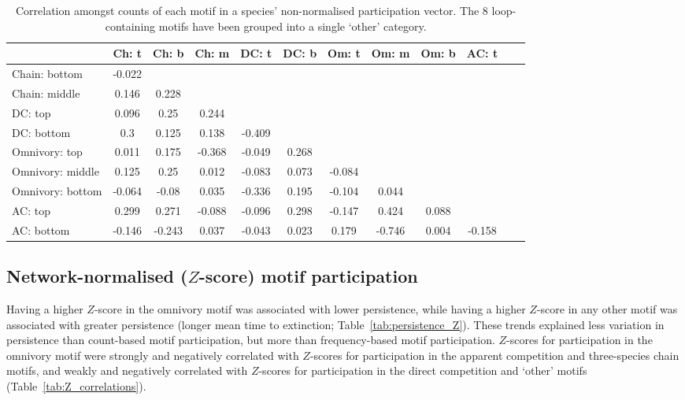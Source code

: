 \documentclass[12pt]{article}
\begin{document}
		\begin{table}[hb!]
    		\caption{Correlation amongst counts of each motif in a species' non-normalised participation vector. The 8 loop-containing motifs have been grouped into a single `other' category.}
    		\label{tab:position_freq_correlations}
    		\footnotesize
    		\begin{tabular}{l | c c c c c c c c c c c}    
        		&	Ch: t	&	Ch: b	&	Ch: m	&	DC: t	&	DC: b	&	Om: t	&	Om: m	&	Om: b	&	AC: t	\\
        		\hline
                Chain: bottom	&	-0.022	&		&		&		&		&		&		&		&		\\
                Chain: middle	&	0.146	&	0.228	&		&		&		&		&		&		&		\\
                DC: top	&	0.096	&	0.25	&	0.244	&		&		&		&		&		&		\\
                DC: bottom	&	0.3	&	0.125	&	0.138	&	-0.409	&		&		&		&		&		\\
                Omnivory: top	&	0.011	&	0.175	&	-0.368	&	-0.049	&	0.268	&		&		&		&		\\
                Omnivory: middle	&	0.125	&	0.25	&	0.012	&	-0.083	&	0.073	&	-0.084	&		&		&		\\
                Omnivory: bottom	&	-0.064	&	-0.08	&	0.035	&	-0.336	&	0.195	&	-0.104	&	0.044	&		&		\\
                AC: top	&	0.299	&	0.271	&	-0.088	&	-0.096	&	0.298	&	-0.147	&	0.424	&	0.088	&		\\
                AC: bottom	&	-0.146	&	-0.243	&	0.037	&	-0.043	&	0.023	&	0.179	&	-0.746	&	0.004	&	-0.158	\\
                \hline
            \end{tabular}
            \end{table}


	\subsection*{Network-normalised ($Z$-score) motif participation}

		Having a higher $Z$-score in the omnivory motif was associated with lower persistence, while having a higher $Z$-score in any other motif was associated with greater persistence (longer mean time to extinction; Table~\ref{tab:persistence_Z}).
		These trends explained less variation in persistence than count-based motif participation, but more than frequency-based motif participation.
		$Z$-scores for participation in the omnivory motif were strongly and negatively correlated with $Z$-scores for participation in the apparent competition and three-species chain motifs, and weakly and negatively correlated with $Z$-scores for participation in the direct competition and `other' motifs (Table~\ref{tab:Z_correlations}).
\end{document}
